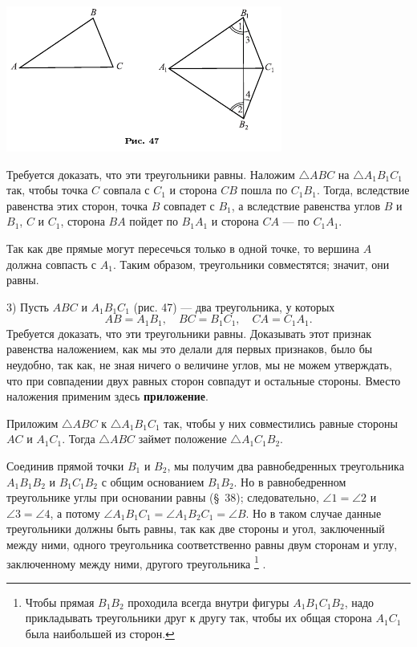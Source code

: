 \documentclass[oneside]{book}
\begin{document}
\includegraphics{pics/ris-47}

Требуется доказать, что эти треугольники равны.
Наложим $\triangle ABC$ на $\triangle A_1B_1C_1$ так, чтобы точка $C$ совпала с $C_1$ и сторона $CB$ пошла по $C_1B_1$.
Тогда, вследствие равенства этих сторон, точка $B$ совпадет с $B_1$, а вследствие равенства углов $B$ и $B_1$, $C$ и $C_1$, сторона $BA$ пойдет по $B_1A_1$ и сторона $CA$ — по $C_1A_1$.

Так как две прямые могут пересечься только в одной точке, то вершина $A$ должна совпасть с $A_1$.
Таким образом, треугольники совместятся;
значит, они равны.

3) Пусть $ABC$ и $A_1B_1C_1$ (рис. 47) — два треугольника, у которых
\[AB = A_1B_1,
\quad
BC = B_1C_1,\quad 
CA = C_1A_1.
\]
Требуется доказать, что эти треугольники равны.
Доказывать этот признак равенства наложением, как мы это делали для первых признаков, было бы неудобно, так как, не зная ничего о величине углов, мы не можем утверждать, что при совпадении двух равных сторон совпадут и остальные стороны.
Вместо наложения применим здесь \textbf{приложение}.

Приложим $\triangle ABC$ к $\triangle A_1B_1C_1$ так, чтобы у них совместились равные стороны $AC$ и $A_1C_1$.
Тогда $\triangle ABC$ займет положение $\triangle A_1C_1B_2$.

Соединив прямой точки $B_1$ и $B_2$, мы получим два равнобедренных треугольника $A_1B_1B_2$ и $B_1C_1B_2$ с общим основанием $B_1B_2$.
Но в равнобедренном треугольнике углы при основании равны (§~38);
следовательно, $\angle 1 = \angle 2$ и $\angle 3 = \angle 4$, а потому $\angle A_1B_1C_1 = \angle A_1B_2C_1 = \angle B$.
Но в таком случае данные треугольники должны быть равны, так как две стороны и угол, заключенный между ними, одного треугольника соответственно равны двум сторонам и углу, заключенному между ними, другого треугольника%
\footnote{Чтобы прямая $B_1B_2$ проходила всегда внутри фигуры $A_1B_1C_1B_2$, надо прикладывать треугольники друг к другу так, чтобы их общая сторона $A_1C_1$ была наибольшей из сторон.}
%
.
\end{document}
